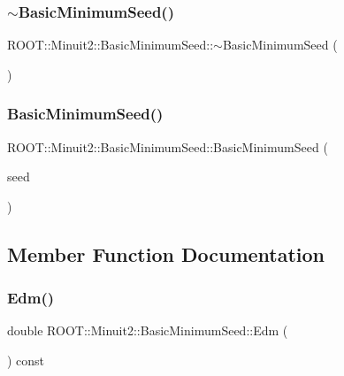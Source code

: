 \subsubsection{\texorpdfstring{$\sim$BasicMinimumSeed()}{~BasicMinimumSeed()}\hspace{0.1cm}{\footnotesize\ttfamily [2/2]}}
{\footnotesize\ttfamily R\+O\+O\+T\+::\+Minuit2\+::\+Basic\+Minimum\+Seed\+::$\sim$\+Basic\+Minimum\+Seed (\begin{DoxyParamCaption}{ }\end{DoxyParamCaption})\hspace{0.3cm}{\ttfamily [inline]}}

\mbox{\label{classROOT_1_1Minuit2_1_1BasicMinimumSeed_a9bd68bcfd30880f67566bfd4f70a2ca6}} 
\subsubsection{\texorpdfstring{BasicMinimumSeed()}{BasicMinimumSeed()}\hspace{0.1cm}{\footnotesize\ttfamily [4/4]}}
{\footnotesize\ttfamily R\+O\+O\+T\+::\+Minuit2\+::\+Basic\+Minimum\+Seed\+::\+Basic\+Minimum\+Seed (\begin{DoxyParamCaption}\item[{const \mbox{\hyperlink{classROOT_1_1Minuit2_1_1BasicMinimumSeed}{Basic\+Minimum\+Seed}} \&}]{seed }\end{DoxyParamCaption})\hspace{0.3cm}{\ttfamily [inline]}}



\subsection{Member Function Documentation}
\mbox{\label{classROOT_1_1Minuit2_1_1BasicMinimumSeed_a10659878d070bed73df23682eab3e88e}} 
\subsubsection{\texorpdfstring{Edm()}{Edm()}\hspace{0.1cm}{\footnotesize\ttfamily [1/2]}}
{\footnotesize\ttfamily double R\+O\+O\+T\+::\+Minuit2\+::\+Basic\+Minimum\+Seed\+::\+Edm (\begin{DoxyParamCaption}{ }\end{DoxyParamCaption}) const\hspace{0.3cm}{\ttfamily [inline]}}

